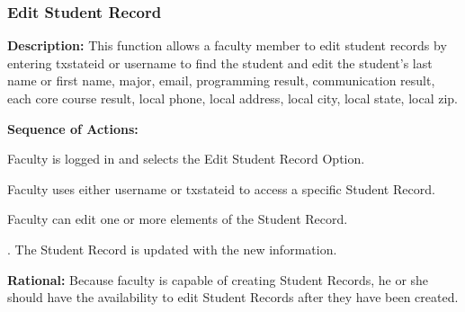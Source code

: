    \subsubsection{\large Edit Student Record} 
   \begin{boxed} %
      \textbf{Description:}
      {\small This function allows a faculty member to edit student records by
         entering txstateid or username to find the student and edit the
         student's last name or first name, major, email, programming result,
         communication result, each core course result, local phone, local
         address, local city, local state, local zip.}
         
         \textbf{Sequence of Actions:}
         \begin{enumerate}
               {\small
            \item Faculty is logged in and selects the Edit Student Record Option.
            \item Faculty uses either username or txstateid to access a specific
               Student Record.
            \item Faculty can edit one or more elements of the Student Record.
            \item. The Student Record is updated with the new information.}
      \end{enumerate}

         \textbf{Rational:}
         {\small Because faculty is capable of creating Student Records, he or she
         should have the availability to edit Student Records after they have
      been created.}
   \end{boxed} %

